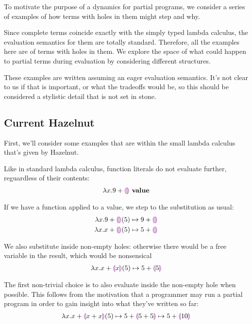 To motivate the purpose of a dynamics for partial programs, we consider a
series of examples of how terms with holes in them might step and why.

Since complete terms coincide exactly with the simply typed lambda
calculus, the evaluation semantics for them are totally
standard. Therefore, all the examples here are of terms with holes in
them. We explore the space of what could happen to partial terms during
evaluation by considering different structures.

These examples are written assuming an eager evaluation semantics. It's not
clear to us if that is important, or what the tradeoffs would be, so this
should be considered a stylistic detail that is not set in stone.

\subsection{Current Hazelnut}
First, we'll consider some examples that are within the small lambda
calculus that's given by Hazelnut.

Like in standard lambda calculus, function literals do not
evaluate further, reguardless of their contents:
\begin{align*}
  {\lambda x. 9 + \textcolor{violet}{\llparenthesis}\textcolor{violet}{\rrparenthesis}} ~\mathbf{value}
\end{align*}

If we have a function applied to a value, we step to the substitution as
usual:
\begin{align*}
  {
        \lambda x.9 + \textcolor{violet}{\llparenthesis}\textcolor{violet}{\rrparenthesis}(5)
      } \mapsto {
        9 + \textcolor{violet}{\llparenthesis}\textcolor{violet}{\rrparenthesis}}
      \\
      {
        \lambda x.x + \textcolor{violet}{\llparenthesis}\textcolor{violet}{\rrparenthesis}(5)
      } \mapsto {
        5 + \textcolor{violet}{\llparenthesis}\textcolor{violet}{\rrparenthesis}}
\end{align*}

We also substitute inside non-empty holes: otherwise there would be a free
variable in the result, which would be nonsensical
\begin{align*}
  {
        \lambda x.x + \textcolor{violet}{\llparenthesis}x\textcolor{violet}{\rrparenthesis}(5)
      } \mapsto {
        5 + \textcolor{violet}{\llparenthesis}5\textcolor{violet}{\rrparenthesis}}
\end{align*}

The first non-trivial choice is to also evaluate inside the non-empty hole
when possible. This follows from the motivation that a programmer may run a
partial program in order to gain insight into what they've written so far:
\begin{align*}
  {
    {
          \lambda x.x + \textcolor{violet}{\llparenthesis}x + x\textcolor{violet}{\rrparenthesis}(5)
        } \mapsto {
          5 + \textcolor{violet}{\llparenthesis}5 + 5\textcolor{violet}{\rrparenthesis}}
  } \mapsto {5 + \textcolor{violet}{\llparenthesis}10\textcolor{violet}{\rrparenthesis}}
\end{align*}

